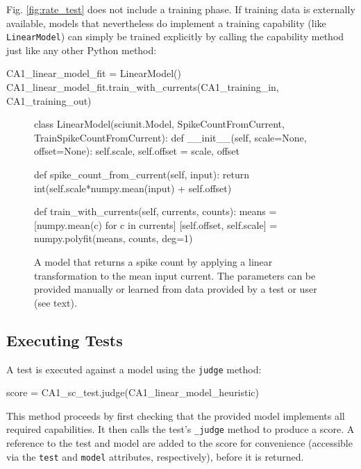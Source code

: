 \documentclass[9pt]{sig-alternate}
\let\verbx\lstinline
\begin{document}
Fig. \ref{fig:rate_test} does not include a training phase. 
If training data is externally available, models that nevertheless do implement a training capability (like \verb|LinearModel|) can simply be trained explicitly by calling the capability method just like any other Python method:
\begin{python}
CA1_linear_model_fit = LinearModel()
CA1_linear_model_fit.train_with_currents(CA1_training_in, CA1_training_out)
\end{python}
\begin{figure}
\begin{python}
class LinearModel(sciunit.Model, SpikeCountFromCurrent, 
    TrainSpikeCountFromCurrent):
  def __init__(self, scale=None, offset=None): 
    self.scale, self.offset = scale, offset
    
  def spike_count_from_current(self, input):
    return int(self.scale*numpy.mean(input) + self.offset)

  def train_with_currents(self, currents, counts):
    means = [numpy.mean(c) for c in currents]
    [self.offset, self.scale] = numpy.polyfit(means, counts, deg=1)    
\end{python}
\caption{A model that returns a spike count by applying a linear transformation to the mean input current. The parameters can be provided manually or learned from data provided by a test or user (see text).}
\label{fig:simple_model}
\vspace{-15px}
\end{figure}

\subsection{Executing Tests} A test is executed against a model using the \verbx{judge} method:
\begin{python}
score = CA1_sc_test.judge(CA1_linear_model_heuristic)
\end{python}

This method proceeds by first checking that the provided model implements all required capabilities. It then calls the test's \verbx{_judge} method to produce a score. A reference to the test and model are added to the score for convenience (accessible via the \verbx{test} and \verbx{model} attributes, respectively), before it is returned.
\end{document}

